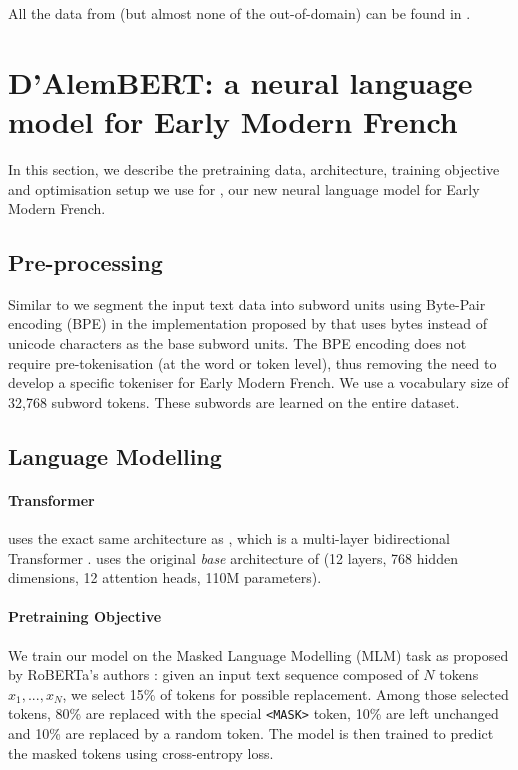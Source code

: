 All the data from \freemlpm (but almost none of the out-of-domain) can be found in \freemmax.

\section{D'AlemBERT: a neural language model for Early Modern French}\label{sec:dAlemBERT}
In this section, we describe the pretraining data, architecture, training objective and optimisation setup we use for \dalembert, our new neural language model for Early Modern French.


\subsection{Pre-processing}
Similar to \roberta \cite{liu-etal-2019-roberta} we segment the input text data into subword units using Byte-Pair encoding (BPE) \cite{sennrich-etal-2016-neural} in the implementation proposed by \cite{radford-etal-2019-language} that uses bytes instead of unicode characters as the base subword units. The BPE encoding does not require pre-tokenisation (at the word or token level), thus removing the need to develop a specific tokeniser for Early Modern French. We use a vocabulary size of 32,768 subword tokens. These subwords are learned on the entire \freemmax dataset.


\subsection{Language Modelling}

\paragraph{Transformer}
\dalembert uses the exact same architecture as \roberta, which is a multi-layer bidirectional Transformer \cite{vaswani-etal-2017-attention}.
\dalembert uses the original \emph{base} architecture of \roberta (12 layers, 768 hidden dimensions, 12 attention heads, 110M parameters).

\paragraph{Pretraining Objective}
We train our model on the Masked Language Modelling (MLM) task as proposed by RoBERTa's authors \cite{liu-etal-2019-roberta}: given an input text sequence composed of $N$ tokens $x_1, ..., x_N$, we select 15\% of tokens for possible replacement. Among those selected tokens, 80\% are replaced with the special \texttt{<MASK>} token, 10\% are left unchanged and 10\% are replaced by a random token. The model is then trained to predict the masked tokens using cross-entropy loss.


